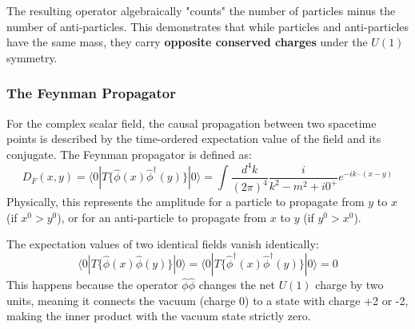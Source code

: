 The resulting operator algebraically "counts" the number of particles minus the number of anti-particles. This demonstrates that while particles and anti-particles have the same mass, they carry \textbf{opposite conserved charges} under the \(U(1)\) symmetry.

\subsubsection{The Feynman Propagator}

For the complex scalar field, the causal propagation between two spacetime points is described by the time-ordered expectation value of the field and its conjugate. The Feynman propagator is defined as:
\[
    D_F(x, y) = \langle 0 | T \{ \hat{\phi}(x) \hat{\phi}^\dagger(y) \} | 0 \rangle = \int \frac{d^4k}{(2\pi)^4} \frac{i}{k^2 - m^2 + i0^+} e^{-ik \cdot (x-y)}
\]
Physically, this represents the amplitude for a particle to propagate from \(y\) to \(x\) (if \(x^0 > y^0\)), or for an anti-particle to propagate from \(x\) to \(y\) (if \(y^0 > x^0\)).

\begin{remark}
    The expectation values of two identical fields vanish identically:
    \[
        \langle 0 | T \{ \hat{\phi}(x) \hat{\phi}(y) \} | 0 \rangle = \langle 0 | T \{ \hat{\phi}^\dagger(x) \hat{\phi}^\dagger(y) \} | 0 \rangle = 0
    \]
    This happens because the operator \(\hat{\phi}\hat{\phi}\) changes the net \(U(1)\) charge by two units, meaning it connects the vacuum (charge 0) to a state with charge +2 or -2, making the inner product with the vacuum state strictly zero.
\end{remark}
